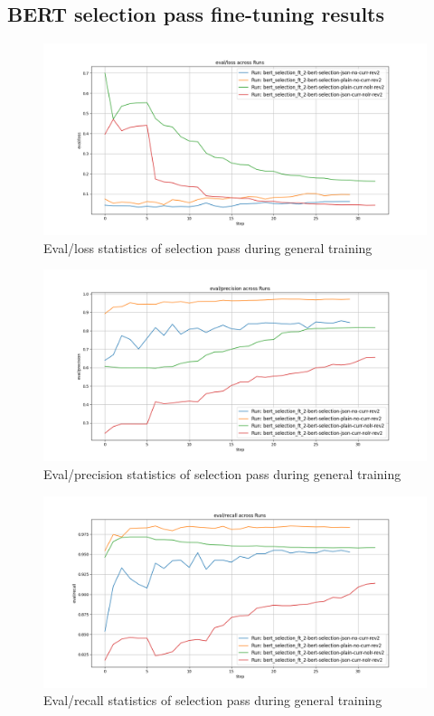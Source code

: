 \documentclass[licencjacka,en]{pracamgr}
\begin{document}
\begin{appendices}

\chapter{BERT selection pass fine-tuning results} \label{AppC}
\begin{figure}[ht]
    \centering
    \includegraphics[width=0.8\linewidth]{bachelor_images/bert_ft/s_elg.png}
    \caption{Eval/loss statistics of selection pass during general training}
    \label{fig:s_elg}
\end{figure}
\begin{figure}[ht]
    \centering
    \includegraphics[width=0.8\linewidth]{bachelor_images/bert_ft/s_epg.png}
    \caption{Eval/precision statistics of selection pass during general training}
    \label{fig:s_epg}
\end{figure}
\begin{figure}[ht]
    \centering
    \includegraphics[width=0.8\linewidth]{bachelor_images/bert_ft/s_erg.png}
    \caption{Eval/recall statistics of selection pass during general training}
    \label{fig:s_erg}
\end{figure}


\end{appendices}
\end{document}
